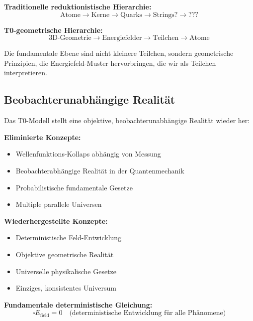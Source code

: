 \documentclass[12pt,a4paper]{report}
\begin{document}
	\textbf{Traditionelle reduktionistische Hierarchie:}
	\begin{equation}
		\text{Atome} \rightarrow \text{Kerne} \rightarrow \text{Quarks} \rightarrow \text{Strings?} \rightarrow \text{???}
	\end{equation}
	
	\textbf{T0-geometrische Hierarchie:}
	\begin{equation}
		\text{3D-Geometrie} \rightarrow \text{Energiefelder} \rightarrow \text{Teilchen} \rightarrow \text{Atome}
	\end{equation}
	
	Die fundamentale Ebene sind nicht kleinere Teilchen, sondern geometrische Prinzipien, die Energiefeld-Muster hervorbringen, die wir als Teilchen interpretieren.
	
	\subsection{Beobachterunabhängige Realität}
	\label{subsec:observer_independent_reality}
	
	Das T0-Modell stellt eine objektive, beobachterunabhängige Realität wieder her:
	
	\textbf{Eliminierte Konzepte:}
	\begin{itemize}
		\item Wellenfunktions-Kollaps abhängig von Messung
		\item Beobachterabhängige Realität in der Quantenmechanik
		\item Probabilistische fundamentale Gesetze
		\item Multiple parallele Universen
	\end{itemize}
	
	\textbf{Wiederhergestellte Konzepte:}
	\begin{itemize}
		\item Deterministische Feld-Entwicklung
		\item Objektive geometrische Realität
		\item Universelle physikalische Gesetze
		\item Einziges, konsistentes Universum
	\end{itemize}
	
	\textbf{Fundamentale deterministische Gleichung:}
	\begin{equation}
		\square E_{\text{field}} = 0 \quad \text{(deterministische Entwicklung für alle Phänomene)}
	\end{equation}
	
\end{document}

